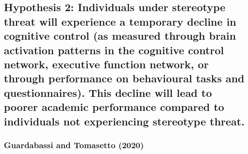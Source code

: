 \documentclass[
  stu,floatsintext]{apa7}
\begin{document}
\subsection{Hypothesis 2: Individuals under stereotype threat will experience a temporary decline in cognitive control (as measured through brain activation patterns in the cognitive control network, executive function network, or through performance on behavioural tasks and questionnaires). This decline will lead to poorer academic performance compared to individuals not experiencing stereotype threat.}\label{hypothesis-2-individuals-under-stereotype-threat-will-experience-a-temporary-decline-in-cognitive-control-as-measured-through-brain-activation-patterns-in-the-cognitive-control-network-executive-function-network-or-through-performance-on-behavioural-tasks-and-questionnaires.-this-decline-will-lead-to-poorer-academic-performance-compared-to-individuals-not-experiencing-stereotype-threat.}

\subsubsection{Guardabassi and Tomasetto (2020)}\label{guardabassiweightstatusweight2020}
\end{document}
